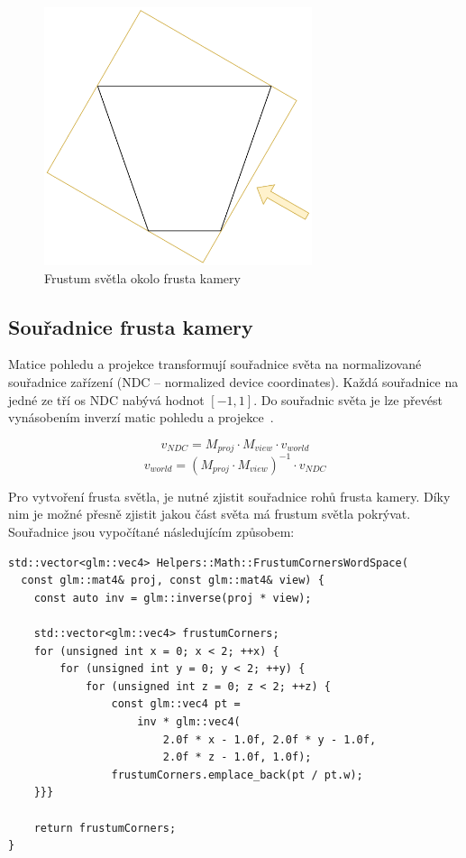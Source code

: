 \documentclass[thesis=M,czech]{FITthesis}[2019/12/23]
\begin{document}
\begin{figure}\centering
	\includegraphics[width=0.7\textwidth]{images/shadows/frustum_fit}
	\caption[Frustum světla okolo frusta kamery]{Frustum světla okolo frusta kamery}\label{fig:shadows_frustum_fit}
\end{figure}

\subsection{Souřadnice frusta kamery}

Matice pohledu a projekce transformují souřadnice světa na normalizované souřadnice zařízení (NDC – normalized device coordinates). Každá souřadnice na jedné ze tří os NDC nabývá hodnot $[-1, 1]$. Do souřadnic světa je lze převést vynásobením inverzí matic pohledu a projekce~\cite{lopgl_csm}.

$$
v_{NDC} = M_{proj} \cdot M_{view} \cdot v_{world}
$$
$$
v_{world} = (M_{proj} \cdot M_{view})^{-1} \cdot v_{NDC}
$$

Pro vytvoření frusta světla, je nutné zjistit souřadnice rohů frusta kamery. Díky nim je možné přesně zjistit jakou část světa má frustum světla pokrývat. Souřadnice jsou vypočítané následujícím způsobem:

\begin{verbatim}
std::vector<glm::vec4> Helpers::Math::FrustumCornersWordSpace(
  const glm::mat4& proj, const glm::mat4& view) {
    const auto inv = glm::inverse(proj * view);

    std::vector<glm::vec4> frustumCorners;
    for (unsigned int x = 0; x < 2; ++x) {
        for (unsigned int y = 0; y < 2; ++y) {
            for (unsigned int z = 0; z < 2; ++z) {
                const glm::vec4 pt =
                    inv * glm::vec4(
                        2.0f * x - 1.0f, 2.0f * y - 1.0f,
                        2.0f * z - 1.0f, 1.0f);
                frustumCorners.emplace_back(pt / pt.w);
    }}}

    return frustumCorners;
}
\end{verbatim}
\end{document}
